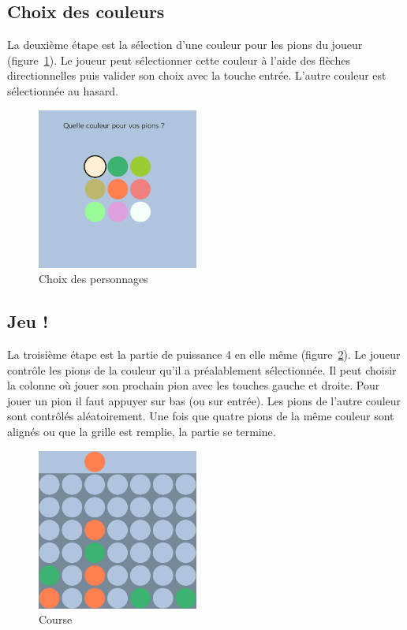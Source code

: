 \documentclass[a4paper]{article}
\begin{document}
\subsection{Choix des couleurs}

La deuxième étape est la sélection d'une couleur pour les pions du joueur (figure~\ref{fig:selection}).
Le joueur peut sélectionner cette couleur à l'aide des flèches directionnelles puis valider son choix avec la touche entrée.
L'autre couleur est sélectionnée au hasard.

\begin{figure}[htbp]
  \centering
  \includegraphics[width=150pt]{selection.png}
  \caption{Choix des personnages}\label{fig:selection}
\end{figure}

\subsection{Jeu !}

La troisième étape est la partie de puissance 4 en elle même (figure~\ref{fig:course}).
Le joueur contrôle les pions de la couleur qu'il a préalablement sélectionnée. 
Il peut choisir la colonne où jouer son prochain pion avec les touches gauche et droite.
Pour jouer un pion il faut appuyer sur bas (ou sur entrée).
Les pions de l'autre couleur sont contrôlés aléatoirement.
Une fois que quatre pions de la même couleur sont alignés ou que la grille est remplie, la partie se termine.

\begin{figure}[htbp]
  \centering
  \includegraphics[width=150pt]{course.png}
  \caption{Course}\label{fig:course}
\end{figure}
\end{document}
